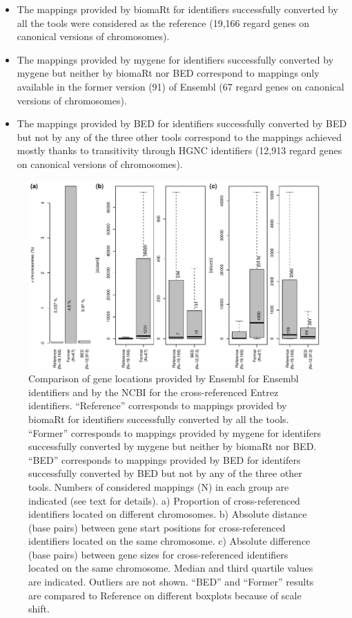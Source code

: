 \documentclass[9pt,a4paper,]{extarticle}
\theoremstyle{definition}
\theoremstyle{definition}
\theoremstyle{definition}
\theoremstyle{remark}
\begin{document}
\begin{itemize}
\item
  The mappings provided by biomaRt for identifiers
  successfully converted
  by all the tools were considered as the reference
  (19,166 regard genes on canonical versions
  of chromosomes).
\item
  The mappings provided by mygene for identifiers
  successfully converted by mygene but neither by biomaRt nor BED
  correspond to mappings only available in the former version (91) of Ensembl
  (67 regard genes on canonical versions
  of chromosomes).
\item
  The mappings provided by BED for identifiers
  successfully converted by BED but not by any of the three other tools
  correspond to the mappings achieved mostly thanks
  to transitivity through HGNC identifiers
  (12,913 regard genes on canonical versions
  of chromosomes).
\end{itemize}

\begin{figure}

{\centering \includegraphics[width=1\linewidth]{BED-F1000-Article_files/figure-latex/geneLocations-1} 

}

\caption{Comparison of gene locations provided by Ensembl for Ensembl identifiers and by the NCBI for the cross-referenced Entrez identifiers. ``Reference'' corresponds to mappings provided by biomaRt for identifiers successfully converted by all the tools. ``Former'' corresponds to mappings provided by mygene for identifers successfully converted by mygene but neither by biomaRt nor BED. ``BED'' corresponds to mappings provided by BED for identifers successfully converted by BED but not by any of the three other tools. Numbers of considered mappings (N) in each group are indicated (see text for details). a) Proportion of cross-referenced identifiers located on different chromosomes. b) Absolute distance (base pairs) between gene start positions for cross-referenced identifiers located on the same chromosome. c) Absolute difference (base pairs) between gene sizes for cross-referenced identifiers located on the same chromosome. Median and third quartile values are indicated. Outliers are not shown. ``BED'' and ``Former'' results are compared to Reference on different boxplots because of scale shift.}\label{fig:geneLocations}
\end{figure}
\end{document}
